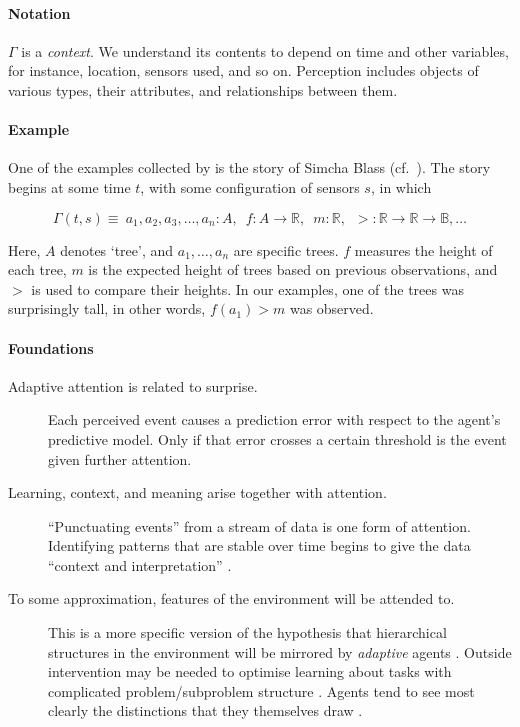  \paragraph{\textbf{\upshape Notation}}

 $\Gamma$ is a \emph{context}.  We understand its contents to depend on
 time and other variables, for instance, location, sensors used, and so
 on.  Perception includes objects of various types, their attributes,
 and relationships between them.

 \paragraph{\textbf{\upshape Example}}

 One of the examples collected by \citet{van1994anatomy} is the story
 of Simcha Blass (cf.~\cite{shoji1977drip}).
 The story begins at some time $t$, with some configuration of sensors
 $s$, in which
 
 $$\Gamma(t,s) \equiv\: a_1, a_2, a_3, \ldots, a_n : A,\enspace
 f:A\rightarrow \mathbb{R},\enspace
 m:\mathbb{R},\enspace
 >:\mathbb{R}\rightarrow\mathbb{R}\rightarrow \mathbb{B}, \ldots$$
 
 Here, $A$ denotes `tree', and $a_1,\ldots,a_n$ are specific trees.
 $f$ measures the height of each tree,
 $m$ is the expected height of trees based on previous observations,
 and  $>$ is used to compare their heights.
 In our examples, one of the trees was surprisingly tall, in other words, $f(a_1)>m$
 was observed.


 \begin{center}
 \asterism
 \end{center}

 \paragraph{\textbf{\upshape Foundations}}

 \begin{description}
 \item[Adaptive attention is related to surprise.] Each perceived event causes a prediction error with respect to the agent's predictive model. Only if that error crosses a certain threshold is the event given further attention.
 \item[Learning, context, and meaning arise together with attention.]
   ``Punctuating events'' \cite[p.~301]{bateson-logical-categories}
   from a stream of data is one form of attention.  Identifying
   patterns that are stable over time begins to give the data
   ``context and interpretation'' \cite{rowley2007wisdom}.
 \item[To some approximation, features of the environment will be attended to.] This is a more specific version of the hypothesis
   that hierarchical structures in the environment will be mirrored by
   \emph{adaptive} agents \cite{simon1962architecture,simon1995near}.
   Outside intervention may be needed to optimise learning about tasks
   with complicated problem/subproblem structure
   \cite{goldenberg2004may}.
    Agents tend to see most clearly the
    distinctions that they themselves draw
    \cite{keeney1982epistemology}.
 \end{description}

